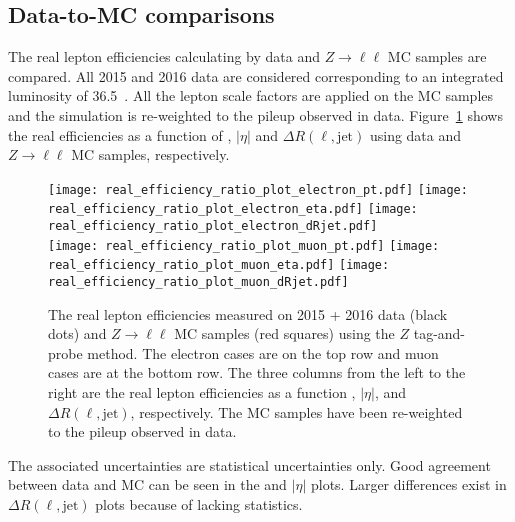 
\subsection{Data-to-MC comparisons}
\label{subsec:app_RLE_data_to_mc_comparisons}
The real lepton efficiencies calculating by data and $Z\to \ell\ell$ MC samples are compared.
All 2015 and 2016 data are considered corresponding to an integrated luminosity of 36.5~\ifb.
All the lepton scale factors are applied on the MC samples and the simulation is re-weighted to the pileup observed in data.
Figure~\ref{fig:app_RLE_real_efficiency_pt_eta_dRjet} shows the real efficiencies as a function of \pt, $|\eta|$ and $\Delta R(\ell, \mathrm{jet})$ using data and $Z\to \ell \ell$ MC samples, respectively.
%
\begin{figure}[htbp]
    \texttt{[image: real\_efficiency\_ratio\_plot\_electron\_pt.pdf]}
    \texttt{[image: real\_efficiency\_ratio\_plot\_electron\_eta.pdf]}
    \texttt{[image: real\_efficiency\_ratio\_plot\_electron\_dRjet.pdf]}\\
    \texttt{[image: real\_efficiency\_ratio\_plot\_muon\_pt.pdf]}
    \texttt{[image: real\_efficiency\_ratio\_plot\_muon\_eta.pdf]}
    \texttt{[image: real\_efficiency\_ratio\_plot\_muon\_dRjet.pdf]}
    \caption{The real lepton efficiencies measured on 2015 + 2016 data (black dots) and $Z\to \ell\ell$ MC samples (red squares) using the $Z$ tag-and-probe method.
    The electron cases are on the top row and muon cases are at the bottom row.
    The three columns from the left to the right are the real lepton efficiencies as a function \pt, $|\eta|$, and $\Delta R(\ell, \mathrm{jet})$, respectively.
    The MC samples have been re-weighted to the pileup observed in data.}
    \label{fig:app_RLE_real_efficiency_pt_eta_dRjet}
\end{figure}
%
The associated uncertainties are statistical uncertainties only.
Good agreement between data and MC can be seen in the \pt and $|\eta|$ plots.
Larger differences exist in $\Delta R(\ell, \mathrm{jet})$ plots because of lacking statistics.


